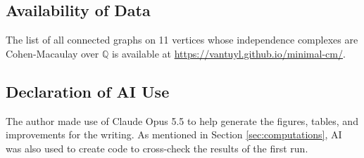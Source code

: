 \documentclass[12pt]{amsart}
\theoremstyle{plain}
\theoremstyle{definition}
\theoremstyle{remark}
\numberwithin{equation}{section}
\numberwithin{equation}{section}
\begin{document}
\subsection*{Availability of Data} 
The list of all connected graphs on 11 vertices whose independence complexes are Cohen-Macaulay over $\mathbb{Q}$ is available at \url{https://vantuyl.github.io/minimal-cm/}.

\subsection*{Declaration of AI Use}  The author made use of Claude Opus 5.5
to help generate the figures, tables, and improvements for the writing.  As mentioned in
Section \ref{sec:computations}, AI was also used to create code to 
cross-check the results of the first run.  

\end{document}

